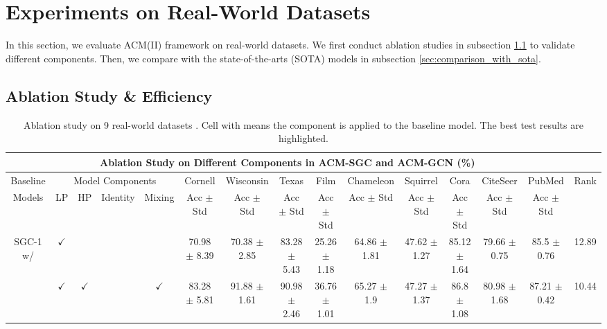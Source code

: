 \documentclass{article}
\newcommand{\0}{{\boldsymbol{0}}}
\newcommand{\6}{{\partial}}
\newcommand{\8}{{\infty}}
\newcommand{\4}{{\nabla}}
\begin{document}
\section{Experiments on Real-World Datasets}
\label{sec:experiments}
In this section, we evaluate ACM(II) framework on real-world datasets. We first conduct ablation studies in subsection \ref{sec:ablation_tests_running_time} to validate different components. Then, we compare with the state-of-the-arts (SOTA) models in subsection \ref{sec:comparison_with_sota}.

\subsection{Ablation Study \& Efficiency}
\label{sec:ablation_tests_running_time}
\begin{table}[htbp]
  \centering
  \tiny
  \caption{Ablation study on 9 real-world datasets \cite{pei2020geom}. Cell with \checkmark means the component is applied to the baseline model. The best test results are highlighted.}
  \label{tab:ablation_study}
  \setlength{\tabcolsep}{1pt}
    \begin{tabular}{c|cccc|ccccccccc|r}
    \toprule
    \toprule
    \multicolumn{14}{c}{Ablation Study on Different Components in ACM-SGC and ACM-GCN (\%)}                       &  \\
    \midrule
    \multicolumn{1}{p{4.125em}|}{Baseline    } & \multicolumn{4}{c|}{Model Components} & Cornell & Wisconsin & Texas & Film  & Chameleon & Squirrel & Cora  & CiteSeer & PubMed & \multicolumn{1}{c}{\multirow{1}[4]{*}{Rank}} \\
\cmidrule{2-14}    \multicolumn{1}{p{4.125em}|}{Models} & LP    & HP    & Identity & Mixing & Acc $\pm$ Std & Acc $\pm$ Std & Acc $\pm$ Std & Acc $\pm$ Std & Acc $\pm$ Std & Acc $\pm$ Std & Acc $\pm$ Std & Acc $\pm$ Std & Acc $\pm$ Std &  \\
    \midrule
    \multicolumn{1}{c|}{\multirow{5}[1]{*}{SGC-1 w/}} & $\checkmark$ &       &       &       & 70.98 $\pm$ 8.39 & 70.38 $\pm$ 2.85 & 83.28 $\pm$ 5.43 & 25.26 $\pm$ 1.18 & 64.86 $\pm$ 1.81 & 47.62 $\pm$ 1.27 & 85.12 $\pm$ 1.64 & 79.66 $\pm$ 0.75 & 85.5 $\pm$ 0.76 & \multicolumn{1}{c}{12.89} \\
          & $\checkmark$ & $\checkmark$ &       & $\checkmark$ & 83.28 $\pm$ 5.81 & 91.88 $\pm$ 1.61 & 90.98 $\pm$ 2.46 & 36.76 $\pm$ 1.01 & 65.27 $\pm$ 1.9 & 47.27 $\pm$ 1.37 & 86.8 $\pm$ 1.08 & 80.98 $\pm$ 1.68 & 87.21 $\pm$ 0.42 & \multicolumn{1}{c}{10.44} \\

\end{tabular}
\end{table}
\end{document}
